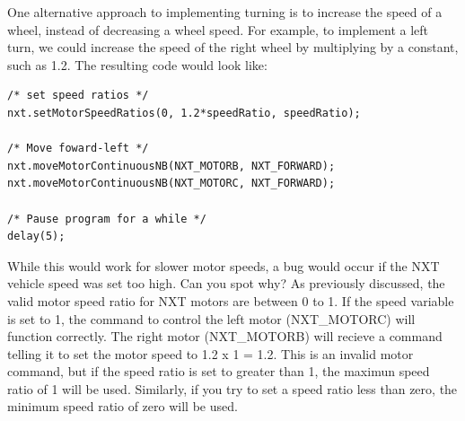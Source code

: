 \documentclass[11pt]{article}
\begin{document}
One alternative approach to implementing turning is to increase the speed of a 
wheel, instead of decreasing a wheel speed. For example, to implement a left 
turn, we could increase the speed of the right wheel by multiplying by a constant, 
such as 1.2.  The resulting code would look like:
\begin{lstlisting}
/* set speed ratios */
nxt.setMotorSpeedRatios(0, 1.2*speedRatio, speedRatio);

/* Move foward-left */
nxt.moveMotorContinuousNB(NXT_MOTORB, NXT_FORWARD);
nxt.moveMotorContinuousNB(NXT_MOTORC, NXT_FORWARD);

/* Pause program for a while */
delay(5);
\end{lstlisting}
While this would work for slower motor speeds, a bug would occur if the NXT 
vehicle speed was set too high. Can you spot why? As previously discussed, the 
valid motor speed ratio for NXT motors are between 0 to 1. If the speed variable 
is set to 1, the command to control the left motor (NXT\_MOTORC) will function 
correctly. The right motor (NXT\_MOTORB) will recieve a command telling it to 
set the motor speed to 1.2 x 1 = 1.2. This is an invalid motor command, but if 
the speed ratio is set to greater than 1, the maximun speed ratio of 1 will be
used. Similarly, if you try to set a speed ratio less than zero, the minimum 
speed ratio of zero will be used.
\end{document}
